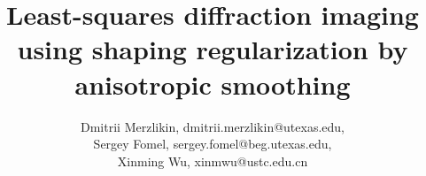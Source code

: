 \renewcommand{\thefootnote}{\fnsymbol{footnote}}

\title{Least-squares diffraction imaging using shaping regularization by anisotropic smoothing}

\author{Dmitrii Merzlikin\footnotemark[1], dmitrii.merzlikin@utexas.edu, \\
	Sergey Fomel\footnotemark[2], sergey.fomel@beg.utexas.edu, \\
        Xinming Wu\footnotemark[3], xinmwu@ustc.edu.cn}

\address{
\footnotemark[1]Formerly Bureau of Economic Geology \\
John A. and Katherine G. Jackson School of Geosciences \\
The University of Texas at Austin \\
University Station, Box X \\
Austin, Texas 78713-8924, USA; \\
presently WesternGeco \\
Schlumberger \\
3750 Briarpark Drive \\
Houston, Texas 77042, USA\\
E-mail: dmitrii.merzlikin@utexas.edu (corresponding author)
\footnotemark[2]Bureau of Economic Geology \\
John A. and Katherine G. Jackson School of Geosciences \\
The University of Texas at Austin \\
University Station, Box X \\
Austin, Texas 78713-8924, USA \\
\footnotemark[3]Formerly Bureau of Economic Geology \\
John A. and Katherine G. Jackson School of Geosciences \\
The University of Texas at Austin \\
University Station, Box X \\
Austin, Texas 78713-8924, USA; \\
presently School of Earth and Space Sciences \\
University of Science and Technology of China \\
Hefei, China \\
}


\maketitle

